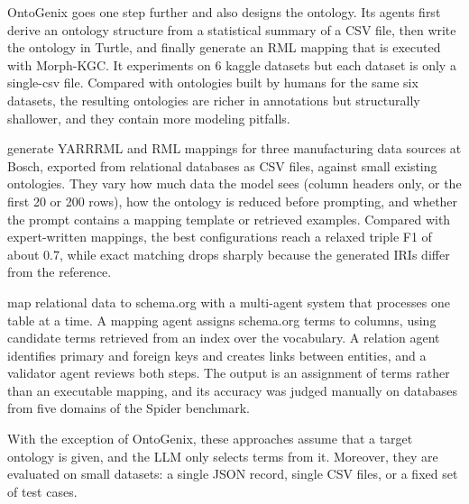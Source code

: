 OntoGenix \citep{valcalvo2025ontogenix} goes one step further and also designs the ontology. Its agents first derive an ontology structure from a statistical summary of a CSV file, then write the ontology in Turtle, and finally generate an RML mapping that is executed with Morph-KGC\@. It experiments on 6 kaggle datasets but each dataset is only a single-csv file. Compared with ontologies built by humans for the same six datasets, the resulting ontologies are richer in annotations but structurally shallower, and they contain more modeling pitfalls.

\citet{schmidt2025llm} generate YARRRML and RML mappings for three manufacturing data sources at Bosch, exported from relational databases as CSV files, against small existing ontologies. They vary how much data the model sees (column headers only, or the first 20 or 200 rows), how the ontology is reduced before prompting, and whether the prompt contains a mapping template or retrieved examples. Compared with expert-written mappings, the best configurations reach a relaxed triple F1 of about 0.7, while exact matching drops sharply because the generated IRIs differ from the reference.


\citet{trajanoska2025multi} map relational data to schema.org with a multi-agent system that processes one table at a time. A mapping agent assigns schema.org terms to columns, using candidate terms retrieved from an index over the vocabulary. A relation agent identifies primary and foreign keys and creates links between entities, and a validator agent reviews both steps. The output is an assignment of terms rather than an executable mapping, and its accuracy was judged manually on databases from five domains of the Spider benchmark.

With the exception of OntoGenix, these approaches assume that a target ontology is given, and the LLM only selects terms from it. Moreover, they are evaluated on small datasets: a single JSON record, single CSV files, or a fixed set of test cases.

